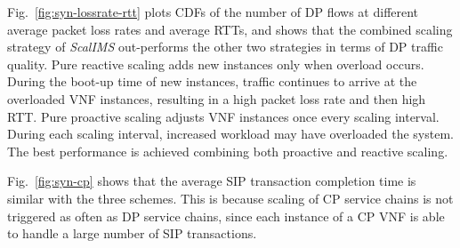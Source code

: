 Fig.~\ref{fig:syn-lossrate-rtt} plots CDFs of the number of DP flows at different average packet loss rates and average RTTs, and shows that the combined scaling strategy of {\em ScalIMS} out-performs the other two strategies in terms of DP traffic quality. %
 Pure reactive scaling adds new instances only when overload occurs. During the boot-up time of new instances, traffic continues to arrive at the overloaded VNF instances, resulting in a high packet loss rate and then high RTT. Pure proactive scaling adjusts VNF instances once every scaling interval. During each scaling interval, increased workload may have overloaded the system. The best performance is achieved combining both proactive and reactive scaling.

Fig.~\ref{fig:syn-cp} shows that the average SIP transaction completion time is similar with the three schemes. This is because scaling of CP service chains is not triggered as often as DP service chains, since each instance of a CP VNF is able to handle a large number of SIP transactions. %



